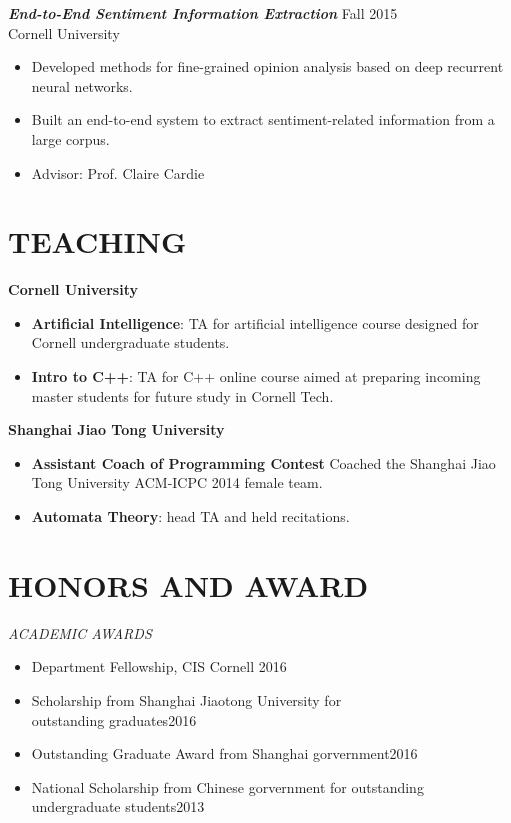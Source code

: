 \documentclass[margin, 10pt]{res} %
\begin{document}
\begin{resume}
{\sl \textbf{End-to-End Sentiment Information Extraction}} \hfill Fall 2015\\
Cornell University
\begin{itemize}
\item Developed methods for fine-grained opinion analysis based on deep recurrent
  neural networks.
\item Built an end-to-end system to extract sentiment-related information
  from a large corpus.
\item Advisor: Prof. Claire Cardie
\end{itemize}

\section{TEACHING}
\textbf{Cornell University}
\begin{itemize}
\item \textbf{Artificial Intelligence}: TA for artificial intelligence course designed for Cornell undergraduate students.
\item \textbf{Intro to C++}: TA for C++ online course aimed at preparing incoming master students for future study in Cornell Tech. 
\end{itemize}

\textbf{Shanghai Jiao Tong University}
\begin{itemize}
\item \textbf{Assistant Coach of Programming Contest} Coached the Shanghai Jiao Tong University ACM-ICPC 2014 female team.
\item \textbf{Automata Theory}: head TA and held recitations.
\end{itemize}




\section{HONORS AND AWARD}

{\sl ACADEMIC AWARDS}\\
\begin{itemize}
\item Department Fellowship, CIS Cornell \hfill 2016
\item Scholarship from Shanghai Jiaotong University for\\ outstanding graduates\hfill 2016
\item Outstanding Graduate Award from Shanghai gorvernment\hfill 2016
\item National Scholarship from Chinese gorvernment for outstanding\\ undergraduate students\hfill 2013 
\end{itemize}




\end{resume}
\end{document}
